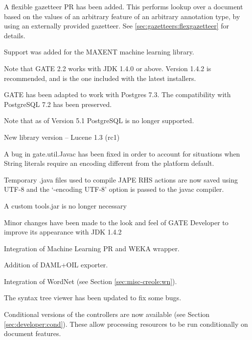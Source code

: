 A flexible gazetteer PR has been added. This performs lookup over a
document based on the values of an arbitrary feature of an arbitrary
annotation type, by using an externally provided gazetteer. See
\ref{sec:gazetteers:flexgazetteer} for details.



Support was added for the MAXENT machine learning library.



Note that GATE 2.2 works with JDK 1.4.0 or above. Version 1.4.2 is
recommended, and is the one included with the latest installers.

GATE has been adapted to work with Postgres 7.3. The compatibility with
PostgreSQL 7.2 has been preserved. 

Note that as of Version 5.1 PostgreSQL is no longer supported.


New library version -- Lucene 1.3 (rc1)

A bug in gate.util.Javac has been fixed in order to account for situations
when String literals require an encoding different from the platform
default.

Temporary .java files used to compile JAPE RHS actions are now saved using
UTF-8 and the `-encoding UTF-8' option is passed to the javac compiler.

A custom tools.jar is no longer necessary

Minor changes have been made to the look and feel of GATE Developer to
improve its appearance with JDK 1.4.2


Integration of Machine Learning PR and WEKA wrapper.

Addition of DAML+OIL exporter.

Integration of WordNet (see Section \ref{sec:misc-creole:wn}).

The syntax tree viewer has been updated to fix some bugs.



Conditional versions of the controllers are now available (see Section
\ref{sec:developer:cond}). These allow processing resources to be run
conditionally on document features.

